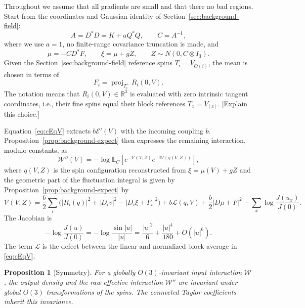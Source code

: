 \documentclass[11pt]{article}
\newcommand{\R}{\mathbb R}
\newcommand{\E}{\mathbb E}
\newcommand{\proj}{\operatorname{proj}}
\newcommand{\red}{\color{red}}
\numberwithin{equation}{section}
\newtheorem{proposition}[theorem]{Proposition}
\theoremstyle{definition}
\theoremstyle{plain}
\begin{document}
Throughout we assume that all gradients are small and that there no bad regions.
Start from the coordinates and Gaussian identity of Section~\ref{sec:background-field}:
\begin{equation}
 A=D^*D=K+aQ^*Q,\qquad C=A^{-1},
\end{equation}
where we use $a=1$,
no finite-range covariance truncation is made,
and
\begin{equation}
 \mu=-CD^*F,\qquad \xi=\mu+gZ,\qquad
 Z\sim N(0,C\otimes I_3).
\end{equation}
Given the Section~\ref{sec:background-field} reference spins
$T_i=V_{O(i)}$, the mean is chosen in terms of
\begin{equation}
 F_i=\proj_{T_i^\perp}R_i(0,V).
\end{equation}
The notation means that $R_i(0,V)\in \R^3$ is evaluated with zero intrinsic tangent
coordinates, i.e., their fine spins equal their block references $T_x=V_{[x]}$. 
{\red [Explain this choice.]}

Equation~\eqref{eq:cEqV} extracts $b\mathcal E'(V)$ with the incoming coupling $b$.
Proposition~\ref{prop:background-expect}
then expresses the remaining interaction, modulo constants, as
\begin{equation}
 \mathcal W''(V)
   =-\log\E_C\left[e^{-\mathcal V(V,Z)}
                         e^{-\mathcal W(q(V,Z))}\right],
 \label{eq:pert-connected-action}
\end{equation}
where $q(V,Z)$ is the spin configuration reconstructed from $\xi=\mu(V)+gZ$ and the
geometric part of the fluctuation integral is given by Proposition~\ref{prop:background-expect} by
\begin{equation}
 \mathcal V(V,Z)
 =\frac b2\sum_i
   \bigl(|R_i(q)|^2+|D_iv|^2-|D_i\xi+F_i|^2\bigr)
   +b\mathcal L(q,V)+\frac b2|D\mu+F|^2
 -\sum_x\log\frac{J(u_x)}{J(0)}.
   \label{eq:pert-vertices}
\end{equation}
%
The Jacobian is
\begin{equation}
 -\log\frac{J(u)}{J(0)}
 =-\log\frac{\sin|u|}{|u|}
 =\frac{|u|^2}{6}+\frac{|u|^4}{180}+O(|u|^6).
\end{equation}
The term $\mathcal L$ is the defect between the linear and normalized block average in \eqref{eq:cEqV}.






\begin{proposition}[Symmetry]
\label{prop:spin-symmetry}
For a globally $O(3)$-invariant input interaction $\mathcal W$,
the output density and the raw effective interaction $\mathcal W''$
are invariant under global
$O(3)$ transformations of the spins.
The connected Taylor coefficients inherit this invariance. 
\end{proposition}
\end{document}
